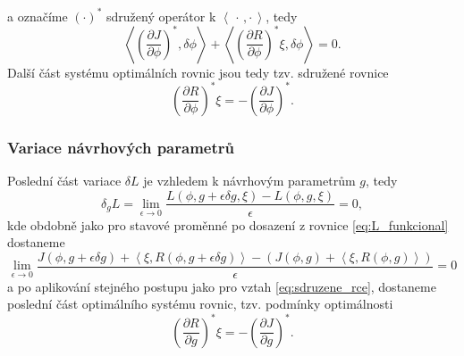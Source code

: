 a označíme $ (\cdot)^* $ sdružený operátor k $  \left\langle \, \cdot\,,\cdot \,  \right\rangle $, tedy
\begin{equation*}
\left\langle   \left(\frac{\partial J}{\partial \phi}\right)^* ,\delta\phi  \right\rangle
+  \left\langle \left(\dfrac{\partial R}{\partial \phi}\right)^* \xi ,  \delta\phi\right\rangle
=0.
\end{equation*}
Další část systému optimálních rovnic jsou tedy tzv. sdružené rovnice
\begin{equation}\label{eq:sdruzene_rce}
\left( \dfrac{\partial R}{\partial \phi} \right)^* \xi = 
- \left(\dfrac{\partial J}{\partial \phi}\right)^*.
\end{equation}

\subsubsection{Variace návrhových parametrů}

Poslední část variace $ \delta L $ je vzhledem k návrhovým parametrům $ g $, tedy
\begin{equation*}
\delta_g L =
\lim\limits_{\epsilon\rightarrow 0}
\dfrac{L(\phi,g+\epsilon\delta g,\xi)-L(\phi,g,\xi)}
{\epsilon}
=0,
\end{equation*}
kde obdobně jako pro stavové proměnné po dosazení z rovnice \ref{eq:L_funkcional} dostaneme
\begin{equation*}
\lim\limits_{\epsilon\rightarrow0} \dfrac
{J(\phi, g+\epsilon\delta g) + 
	 \left\langle\xi , R(\phi, g+\epsilon\delta g)\right\rangle  -  (J(\phi, g) +  \left\langle\xi , R(\phi, g)\right\rangle)}
{\epsilon}
=0
\end{equation*}
a po aplikování stejného postupu jako pro vztah \ref{eq:sdruzene_rce}, dostaneme poslední část optimálního systému rovnic, tzv. podmínky optimálnosti
\begin{equation}\label{eq:podminky_optimalnosti}
\left( \dfrac{\partial R}{\partial g} \right)^* \xi = 
- \left(\dfrac{\partial J}{\partial g}\right)^*.
\end{equation}

